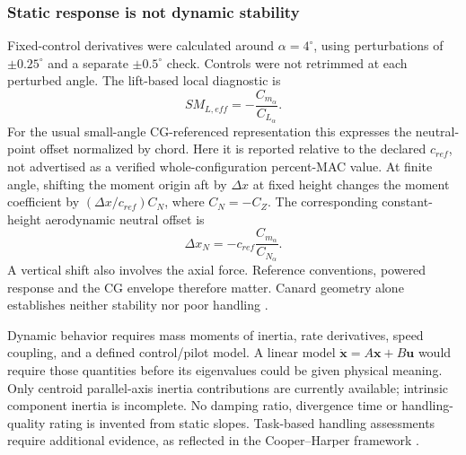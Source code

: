 \documentclass[10pt,letterpaper]{article}
\begin{document}
\subsubsection{Static response is not dynamic stability}
Fixed-control derivatives were calculated around $\alpha=4^\circ$, using perturbations of $\pm0.25^\circ$ and a separate $\pm0.5^\circ$ check. Controls were not retrimmed at each perturbed angle. The lift-based local diagnostic is
\begin{equation}
SM_{L,eff}=-\frac{C_{m_\alpha}}{C_{L_\alpha}}.
\label{eq:sm}
\end{equation}
For the usual small-angle CG-referenced representation this expresses the neutral-point offset normalized by chord. Here it is reported relative to the declared $c_{ref}$, not advertised as a verified whole-configuration percent-MAC value. At finite angle, shifting the moment origin aft by $\Delta x$ at fixed height changes the moment coefficient by $(\Delta x/c_{ref})C_N$, where $C_N=-C_Z$. The corresponding constant-height aerodynamic neutral offset is
\begin{equation}
\Delta x_N=-c_{ref}\frac{C_{m_\alpha}}{C_{N_\alpha}}.
\label{eq:neutral}
\end{equation}
A vertical shift also involves the axial force. Reference conventions, powered response and the CG envelope therefore matter. Canard geometry alone establishes neither stability nor poor handling \cite{ref15}.

Dynamic behavior requires mass moments of inertia, rate derivatives, speed coupling, and a defined control/pilot model. A linear model $\dot{\boldsymbol x}=A\boldsymbol x+B\boldsymbol u$ would require those quantities before its eigenvalues could be given physical meaning. Only centroid parallel-axis inertia contributions are currently available; intrinsic component inertia is incomplete. No damping ratio, divergence time or handling-quality rating is invented from static slopes. Task-based handling assessments require additional evidence, as reflected in the Cooper--Harper framework \cite{ref23}.
\end{document}
